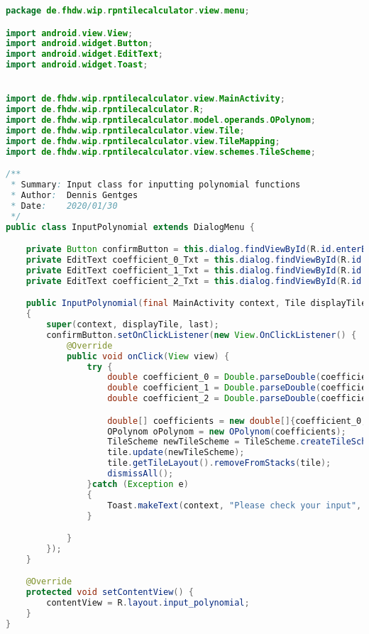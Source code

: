 \begin{lstlisting}[caption=InputPolynomial,label=list:InputPolynomial,language=Java]
package de.fhdw.wip.rpntilecalculator.view.menu;

import android.view.View;
import android.widget.Button;
import android.widget.EditText;
import android.widget.Toast;


import de.fhdw.wip.rpntilecalculator.view.MainActivity;
import de.fhdw.wip.rpntilecalculator.R;
import de.fhdw.wip.rpntilecalculator.model.operands.OPolynom;
import de.fhdw.wip.rpntilecalculator.view.Tile;
import de.fhdw.wip.rpntilecalculator.view.TileMapping;
import de.fhdw.wip.rpntilecalculator.view.schemes.TileScheme;

/**
 * Summary: Input class for inputting polynomial functions
 * Author:  Dennis Gentges
 * Date:    2020/01/30
 */
public class InputPolynomial extends DialogMenu {

    private Button confirmButton = this.dialog.findViewById(R.id.enterButton2);
    private EditText coefficient_0_Txt = this.dialog.findViewById(R.id.coefficient_0);
    private EditText coefficient_1_Txt = this.dialog.findViewById(R.id.coefficient_1);
    private EditText coefficient_2_Txt = this.dialog.findViewById(R.id.coefficient_2);

    public InputPolynomial(final MainActivity context, Tile displayTile, DialogMenu last)
    {
        super(context, displayTile, last);
        confirmButton.setOnClickListener(new View.OnClickListener() {
            @Override
            public void onClick(View view) {
                try {
                    double coefficient_0 = Double.parseDouble(coefficient_0_Txt.getText().toString());
                    double coefficient_1 = Double.parseDouble(coefficient_1_Txt.getText().toString());
                    double coefficient_2 = Double.parseDouble(coefficient_2_Txt.getText().toString());

                    double[] coefficients = new double[]{coefficient_0, coefficient_1, coefficient_2};
                    OPolynom oPolynom = new OPolynom(coefficients);
                    TileScheme newTileScheme = TileScheme.createTileScheme(TileMapping.O_POLYNOM, oPolynom, 0);
                    tile.update(newTileScheme);
                    tile.getTileLayout().removeFromStacks(tile);
                    dismissAll();
                }catch (Exception e)
                {
                    Toast.makeText(context, "Please check your input", Toast.LENGTH_SHORT).show();
                }

            }
        });
    }

    @Override
    protected void setContentView() {
        contentView = R.layout.input_polynomial;
    }
}
\end{lstlisting}    

